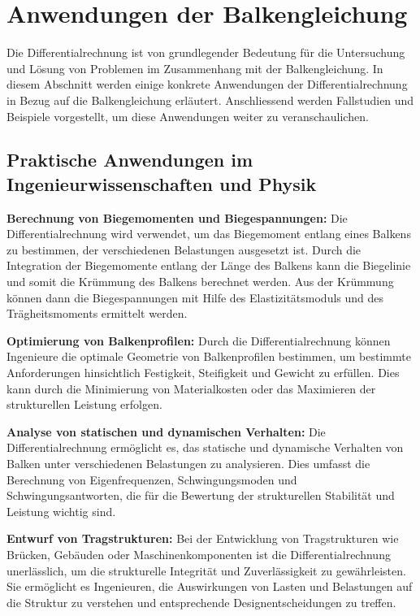 %
%
%
%
\section{Anwendungen der Balkengleichung
\label{balken:section:teil3}}

Die Differentialrechnung ist von grundlegender Bedeutung für die Untersuchung und Lösung von Problemen im Zusammenhang mit der Balkengleichung. 
In diesem Abschnitt werden einige konkrete Anwendungen der Differentialrechnung in Bezug auf die Balkengleichung erläutert. 
Anschliessend werden Fallstudien und Beispiele vorgestellt, um diese Anwendungen weiter zu veranschaulichen.

\subsection{Praktische Anwendungen im Ingenieurwissenschaften und Physik
\label{Praktische Anwendungen im Ingenieurwissenschaften und Physik}}
\textbf{ Berechnung von Biegemomenten und Biegespannungen:}
Die Differentialrechnung wird verwendet, um das Biegemoment entlang eines Balkens zu bestimmen, der verschiedenen Belastungen ausgesetzt ist. 
Durch die Integration der Biegemomente entlang der Länge des Balkens kann die Biegelinie und somit die Krümmung des Balkens berechnet werden. 
Aus der Krümmung können dann die Biegespannungen mit Hilfe des Elastizitätsmoduls und des Trägheitsmoments ermittelt werden.

\textbf{ Optimierung von Balkenprofilen:}
Durch die Differentialrechnung können Ingenieure die optimale Geometrie von Balkenprofilen bestimmen, um bestimmte Anforderungen hinsichtlich Festigkeit, Steifigkeit und Gewicht zu erfüllen. 
Dies kann durch die Minimierung von Materialkosten oder das Maximieren der strukturellen Leistung erfolgen.

\textbf{ Analyse von statischen und dynamischen Verhalten:}
Die Differentialrechnung ermöglicht es, das statische und dynamische Verhalten von Balken unter verschiedenen Belastungen zu analysieren. 
Dies umfasst die Berechnung von Eigenfrequenzen, Schwingungsmoden und Schwingungsantworten, die für die Bewertung der strukturellen Stabilität und Leistung wichtig sind.

\textbf{ Entwurf von Tragstrukturen:}
Bei der Entwicklung von Tragstrukturen wie Brücken, Gebäuden oder Maschinenkomponenten ist die Differentialrechnung unerlässlich, um die strukturelle Integrität und Zuverlässigkeit zu gewährleisten. 
Sie ermöglicht es Ingenieuren, die Auswirkungen von Lasten und Belastungen auf die Struktur zu verstehen und entsprechende Designentscheidungen zu treffen.

